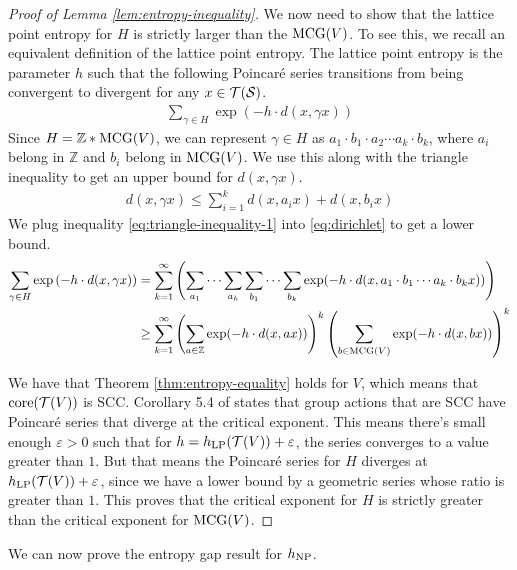 \begin{proof}[Proof of Lemma \ref{lem:entropy-inequality}]
  We now need to show that the lattice point entropy for $H$ is strictly larger than the $\mathrm{MCG}(V)$.
  To see this, we recall an equivalent definition of the lattice point entropy.
  The lattice point entropy is the parameter $h$ such that the following Poincaré series transitions from being convergent to divergent for any $x \in \mathcal{T}(\mathcal{S})$.
  \begin{align}
    \label{eq:dirichlet}
    \sum_{\gamma \in H} \exp\left( -h \cdot d(x, \gamma x) \right)
  \end{align}
  Since $H = \mathbb{Z} * \mathrm{MCG}(V)$, we can represent $\gamma \in H$ as $a_1 \cdot b_1 \cdot a_2 \cdots a_k \cdot b_k$, where $a_i$ belong in $\mathbb{Z}$ and $b_i$ belong in $\mathrm{MCG}(V)$.
  We use this along with the triangle inequality to get an upper bound for $d(x, \gamma x)$.
  \begin{align}
    \label{eq:triangle-inequality-1}
    d(x, \gamma x) \leq \sum_{i=1}^k d(x, a_i x) + d(x, b_i x)
  \end{align}
  We plug inequality \eqref{eq:triangle-inequality-1} into \eqref{eq:dirichlet} to get a lower bound.
  \begin{align}
    \label{eq:dirichlet-lower-bound}
    \sum_{\gamma \in H} \exp\left( -h \cdot d(x, \gamma x) \right) &= \sum_{k=1}^\infty \left(  \sum_{a_1}\cdots \sum_{a_k} \sum_{b_1}\cdots \sum_{b_k}  \exp(-h \cdot d(x, a_1 \cdot b_1 \cdots a_k \cdot b_k x)) \right) \\
    &\geq \sum_{k=1}^{\infty} \left( \sum_{a \in \mathbb{Z}} \exp(-h \cdot d(x, ax)) \right)^k \left( \sum_{b \in \mathrm{MCG}(V)} \exp(-h \cdot d(x, bx)) \right)^k
    \label{eq:dirichlet-lower-bound-2}
  \end{align}

  We have that Theorem \ref{thm:entropy-equality} holds for $V$, which means that $\mathrm{core}(\mathcal{T}(V))$ is SCC.
  Corollary 5.4 of \cite{10.1093/imrn/rny001} states that group actions that are SCC have Poincaré series that diverge at the critical exponent.
  This means there's small enough $\varepsilon > 0$ such that for $h = h_{\mathrm{LP}}(\mathcal{T}(V)) + \varepsilon$, the series converges to a value greater than $1$.
  But that means the Poincaré series for $H$ diverges at $h_{\mathrm{LP}}(\mathcal{T}(V)) + \varepsilon$, since we have a lower bound by a geometric series whose ratio is greater than $1$.
  This proves that the critical exponent for $H$ is strictly greater than the critical exponent for $\mathrm{MCG}(V)$.
\end{proof}

We can now prove the entropy gap result for $h_{\mathrm{NP}}$.

